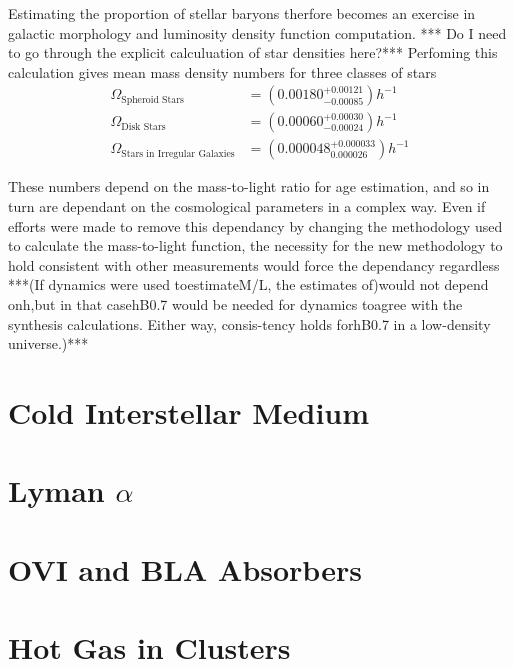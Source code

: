 \par Estimating the proportion of stellar baryons therfore becomes an exercise in galactic morphology and luminosity density function computation. *** Do I need to go through the explicit calculuation of star densities here?*** Perfoming this calculation gives mean mass density numbers for three classes of stars
\begin{align*}
\Omega_{\text{Spheroid Stars}} &= (0.00180^{+0.00121}_{-0.00085}) h^{-1} \\
\Omega_{\text{Disk Stars}} &= (0.00060^{+0.00030}_{-0.00024}) h^{-1} \\
\Omega_{\text{Stars in Irregular Galaxies}} &= (0.000048^{+0.000033}_{0.000026}) h^{-1}
\end{align*}

These numbers depend on the mass-to-light ratio for age estimation, and so in turn are dependant on the cosmological parameters in a complex way. Even if efforts were made to remove this dependancy by changing the methodology used to calculate the mass-to-light function, the necessity for the new methodology to hold consistent with other measurements would force the dependancy regardless ***(If dynamics were used toestimateM/L, the estimates of)would not depend onh,but in that casehB0.7 would be needed for dynamics toagree with the synthesis calculations. Either way, consis-tency holds forhB0.7 in a low-density universe.)***

\section{Cold Interstellar Medium}
\section{Lyman $\alpha$}
\section{OVI and BLA Absorbers}
\section{Hot Gas in Clusters}

